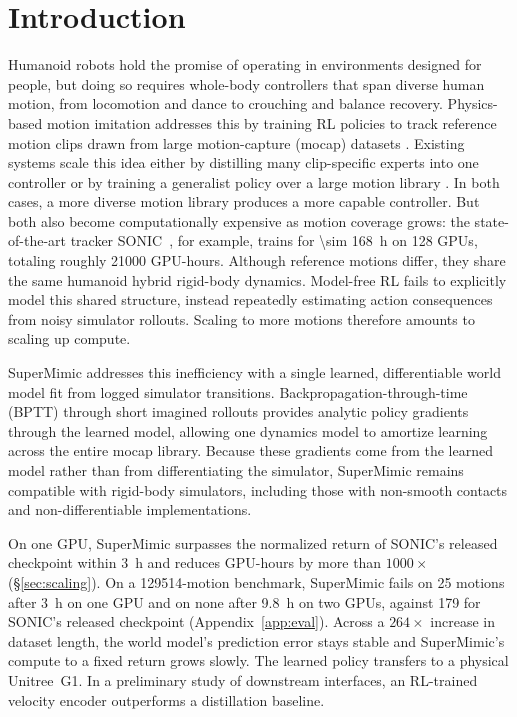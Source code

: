 \section{Introduction}

Humanoid robots hold the promise of operating in environments designed for people, but doing so requires whole-body controllers that span diverse human motion, from locomotion and dance to crouching and balance recovery. Physics-based motion imitation addresses this by training RL policies to track reference motion clips \cite{peng2018deepmimic} drawn from large motion-capture (mocap) datasets \cite{luo2025sonic}. Existing systems scale this idea either by distilling many clip-specific experts into one controller \cite{liao2025beyondmimic} or by training a generalist policy over a large motion library \cite{luo2025sonic}. In both cases, a more diverse motion library produces a more capable controller. But both also become computationally expensive as motion coverage grows: the state-of-the-art tracker SONIC~\citep{luo2025sonic}, for example, trains for \qty{\sim 168}{\hour} on 128 GPUs, totaling roughly \num{21000} GPU-hours. Although reference motions differ, they share the same humanoid hybrid rigid-body dynamics. Model-free RL fails to explicitly model this shared structure, instead repeatedly estimating action consequences from noisy simulator rollouts. Scaling to more motions therefore amounts to scaling up compute.

SuperMimic addresses this inefficiency with a single learned, differentiable world model fit from logged simulator transitions. Backpropagation-through-time (BPTT) through short imagined rollouts provides analytic policy gradients through the learned model, allowing one dynamics model to amortize learning across the entire mocap library. Because these gradients come from the learned model rather than from differentiating the simulator, SuperMimic remains compatible with rigid-body simulators, including those with non-smooth contacts and non-differentiable implementations.

On one GPU, SuperMimic surpasses the normalized return of SONIC's released checkpoint within \qty{3}{\hour} and reduces GPU-hours by more than $1000\times$ (\hyperref[par:accounting]{\S\ref*{sec:scaling}}). On a \num{129514}-motion benchmark, SuperMimic fails on 25 motions after \qty{3}{\hour} on one GPU and on none after \qty{9.8}{\hour} on two GPUs, against 179 for SONIC's released checkpoint (Appendix~\ref{app:eval}). Across a $264\times$ increase in dataset length, the world model's prediction error stays stable and SuperMimic's compute to a fixed return grows slowly. The learned policy transfers to a physical Unitree~G1. In a preliminary study of downstream interfaces, an RL-trained velocity encoder outperforms a distillation baseline.

